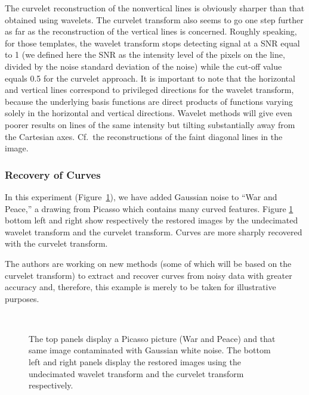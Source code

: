 The curvelet reconstruction of the nonvertical lines is obviously
sharper than that obtained using wavelets.  The curvelet transform
also seems to go one step further as far as the reconstruction of the
vertical lines is concerned. Roughly speaking, for those templates,
the wavelet transform stops detecting signal at a SNR equal to 1
(we defined here the SNR as the intensity level of the pixels
on the line, divided by the noise standard deviation of the noise)
while the cut-off value equals 0.5 for the curvelet approach.  It is
important to note that the horizontal and vertical lines correspond to
privileged directions for the wavelet transform, because the underlying
basis functions are direct products of functions varying solely in
the horizontal
and vertical directions.  Wavelet methods will
give even poorer results on lines
of the same intensity but tilting substantially
away from the Cartesian axes.
Cf.\ the reconstructions of the faint diagonal
lines in the image.

\subsubsection{Recovery of Curves}
In this experiment (Figure~\ref{fig_cur_picasso}), we have added 
Gaussian noise to ``War and Peace,'' a drawing from Picasso which
contains many curved features.  Figure \ref{fig_cur_picasso} bottom left
and right show respectively the restored images by the undecimated
wavelet transform and the curvelet transform. Curves are more sharply
recovered with the curvelet transform.

The authors are working on new methods (some of which will be based on
the curvelet transform) to extract and recover curves from noisy data
with greater accuracy and, therefore, this example is merely to be
taken for illustrative purposes.

\begin{figure}[htb]
\centerline{
\vbox{
\hbox{
}
\hbox{
}}}
\caption{The top panels display a Picasso picture (War and Peace) 
      and that same image
      contaminated with Gaussian white noise. The bottom left and right
      panels display the restored images using the undecimated wavelet
      transform and the curvelet transform respectively.}
\label{fig_cur_picasso}
\end{figure}


